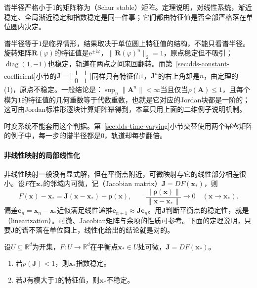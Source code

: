 谱半径严格小于$1$的矩阵称为（Schur stable）矩阵。定理说明，对线性系统，渐近稳定、全局渐近稳定和指数稳定是同一件事；它们都由特征值是否全部严格落在单位圆内决定。

谱半径等于$1$是临界情形，结果取决于单位圆上特征值的结构，不能只看谱半径。旋转矩阵$\bm R(\varphi)$的特征值是$\mathrm e^{\pm\mathrm i\varphi}$，$\lVert\bm R(\varphi)^n\rVert_2=1$，原点稳定但不吸引；$\operatorname{diag}(1,-1)$也稳定，轨道在两点之间来回翻转。而第~\ref{sec:dds-constant-coefficient}小节的$\bm J=\bigl[\begin{smallmatrix}1&1\\0&1\end{smallmatrix}\bigr]$同样只有特征值$1$，$\bm J^n$的右上角却是$n$，由定理的(1)，原点不稳定。一般结论是：$\sup_n\lVert\bm A^n\rVert<\infty$当且仅当$\rho(\bm A)\leq1$，且每个模为$1$的特征值的几何重数等于代数重数，也就是它对应的Jordan块都是一阶的；这可由Jordan标准形逐块计算矩阵幂得到，本章只用上面的二维例子说明机制。

时变系统不能套用这个判据。第~\ref{sec:dds-time-varying}小节交替使用两个幂零矩阵的例子中，每一步的谱半径都是$0$，轨道却每步翻倍。

\paragraph{非线性映射的局部线性化}
非线性映射一般没有显式解，但在平衡点附近，可微映射与它的线性部分相差很小。设$F$在$\bm x_*$的邻域内可微，记（Jacobian matrix）$\bm J=DF(\bm x_*)$，则
\[
  F(\bm x)-\bm x_*=\bm J(\bm x-\bm x_*)+\bm\rho(\bm x),\qquad
  \frac{\lVert\bm\rho(\bm x)\rVert}{\lVert\bm x-\bm x_*\rVert}\to0\quad(\bm x\to\bm x_*).
\]
偏差$\bm e_n=\bm x_n-\bm x_*$近似满足线性递推$\bm e_{n+1}\approx\bm J\bm e_n$。用$\bm J$判断平衡点的稳定性，就是（linearization）。可微、Jacobian矩阵与余项的性质可参考。下面的定理说明，只要$\bm J$的谱不落在单位圆上，线性化给出的结论就是对的。

\begin{theorem}[线性化判据]
\label{thm:dds-linearization}
设$U\subseteq\mathbb R^d$为开集，$F:U\to\mathbb R^d$在平衡点$\bm x_*\in U$处可微，$\bm J=DF(\bm x_*)$。
\begin{enumerate}
  \item 若$\rho(\bm J)<1$，则$\bm x_*$指数稳定。
  \item 若$\bm J$有模大于$1$的特征值，则$\bm x_*$不稳定。
\end{enumerate}
\end{theorem}

